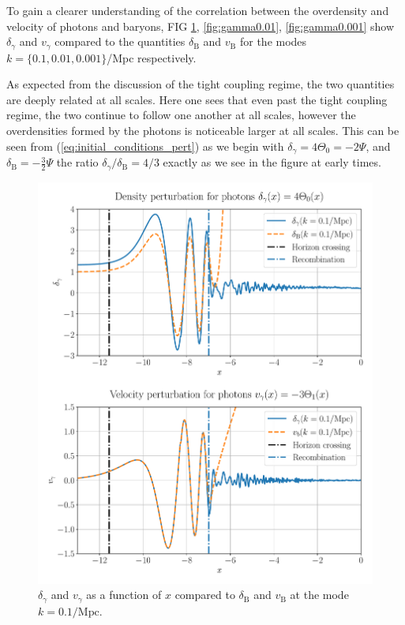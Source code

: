 \documentclass[%
reprint,
 amsmath,amssymb,
 aps,
]{revtex4-2}
\begin{document}
To gain a clearer understanding of the correlation between the overdensity and velocity of photons and baryons, FIG \ref{fig:gamma0.1}, \ref{fig:gamma0.01}, \ref{fig:gamma0.001} show $\delta_\gamma$ and $v_\gamma$ compared to the quantities $\delta_\text{B}$ and $v_\text{B}$ for the modes $k=\{0.1,0.01,0.001\}$/Mpc respectively. 

As expected from the discussion of the tight coupling regime, the two quantities are deeply related at all scales. Here one sees that even past the tight coupling regime, the two continue to follow one another at all scales, however the overdensities formed by the photons is noticeable larger at all scales. This can be seen from (\ref{eq:initial_conditions_pert}) as we begin with $\delta_\gamma=4\Theta_0=-2\Psi$, and $\delta_\text{B}=-\frac{3}{2}\Psi$ the ratio $\delta_\gamma/\delta_\text{B}=4/3$ exactly as we see in the figure at early times. 

\begin{figure}[ht!]
	\includegraphics[width = \linewidth]{Figures/gamma0.1.pdf}
	\caption{$\delta_\gamma$ and $v_\gamma$ as a function of $x$ compared to $\delta_\text{B}$ and $v_\text{B}$ at the mode $k=0.1/\text{Mpc}$.}
	\label{fig:gamma0.1}
\end{figure}
\end{document}
